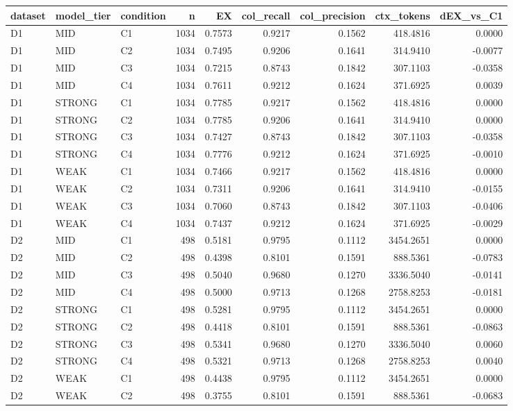 \begin{tabular}{lllrrrrrr}
\toprule
dataset & model\_tier & condition & n & EX & col\_recall & col\_precision & ctx\_tokens & dEX\_vs\_C1 \\
\midrule
D1 & MID & C1 & 1034 & 0.7573 & 0.9217 & 0.1562 & 418.4816 & 0.0000 \\
D1 & MID & C2 & 1034 & 0.7495 & 0.9206 & 0.1641 & 314.9410 & -0.0077 \\
D1 & MID & C3 & 1034 & 0.7215 & 0.8743 & 0.1842 & 307.1103 & -0.0358 \\
D1 & MID & C4 & 1034 & 0.7611 & 0.9212 & 0.1624 & 371.6925 & 0.0039 \\
D1 & STRONG & C1 & 1034 & 0.7785 & 0.9217 & 0.1562 & 418.4816 & 0.0000 \\
D1 & STRONG & C2 & 1034 & 0.7785 & 0.9206 & 0.1641 & 314.9410 & 0.0000 \\
D1 & STRONG & C3 & 1034 & 0.7427 & 0.8743 & 0.1842 & 307.1103 & -0.0358 \\
D1 & STRONG & C4 & 1034 & 0.7776 & 0.9212 & 0.1624 & 371.6925 & -0.0010 \\
D1 & WEAK & C1 & 1034 & 0.7466 & 0.9217 & 0.1562 & 418.4816 & 0.0000 \\
D1 & WEAK & C2 & 1034 & 0.7311 & 0.9206 & 0.1641 & 314.9410 & -0.0155 \\
D1 & WEAK & C3 & 1034 & 0.7060 & 0.8743 & 0.1842 & 307.1103 & -0.0406 \\
D1 & WEAK & C4 & 1034 & 0.7437 & 0.9212 & 0.1624 & 371.6925 & -0.0029 \\
D2 & MID & C1 & 498 & 0.5181 & 0.9795 & 0.1112 & 3454.2651 & 0.0000 \\
D2 & MID & C2 & 498 & 0.4398 & 0.8101 & 0.1591 & 888.5361 & -0.0783 \\
D2 & MID & C3 & 498 & 0.5040 & 0.9680 & 0.1270 & 3336.5040 & -0.0141 \\
D2 & MID & C4 & 498 & 0.5000 & 0.9713 & 0.1268 & 2758.8253 & -0.0181 \\
D2 & STRONG & C1 & 498 & 0.5281 & 0.9795 & 0.1112 & 3454.2651 & 0.0000 \\
D2 & STRONG & C2 & 498 & 0.4418 & 0.8101 & 0.1591 & 888.5361 & -0.0863 \\
D2 & STRONG & C3 & 498 & 0.5341 & 0.9680 & 0.1270 & 3336.5040 & 0.0060 \\
D2 & STRONG & C4 & 498 & 0.5321 & 0.9713 & 0.1268 & 2758.8253 & 0.0040 \\
D2 & WEAK & C1 & 498 & 0.4438 & 0.9795 & 0.1112 & 3454.2651 & 0.0000 \\
D2 & WEAK & C2 & 498 & 0.3755 & 0.8101 & 0.1591 & 888.5361 & -0.0683 \\

\end{tabular}
